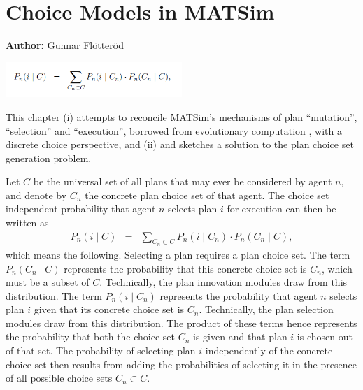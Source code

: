 \chapter{Choice Models in MATSim}
\label{ch:discretechoice}

\hfill \textbf{Author:} Gunnar Flötteröd

\begin{center} \includegraphics[width=0.5\textwidth, angle=0]{understanding/figures/dc.png} \end{center}

This chapter (i) attempts to reconcile MATSim's mechanisms of plan
{}``mutation'', {}``selection'' and {}``execution'', borrowed from evolutionary computation , with a 
discrete choice perspective, and (ii) and sketches a solution to the
plan choice set generation problem.

Let $C$ be the universal set of all plans that may ever be considered
by agent $n$, and denote by $C_{n}$ the concrete plan choice set
of that agent. The choice set independent probability that agent $n$
selects plan $i$ for execution can then be written as
\begin{eqnarray}
P_{n}(i\mid C) & = & \sum_{C_{n}\subset C}P_{n}(i\mid C_{n})\cdot P_{n}(C_{n}\mid C),\label{eq:unconditional-choice-proba}
\end{eqnarray}
which means the following. Selecting a plan requires a plan choice
set. The term $P_{n}(C_{n}\mid C)$ represents the probability that
this concrete choice set is $C_{n}$, which must be a subset of $C$.
Technically, the plan innovation modules draw from this distribution.
The term $P_{n}(i\mid C_{n})$ represents the probability that agent
$n$ selects plan $i$ given that its concrete choice set is $C_{n}$.
Technically, the plan selection modules draw from this distribution.
The product of these terms hence represents the probability that both
the choice set $C_{n}$ is given and that plan $i$ is chosen out
of that set. The probability of selecting plan $i$ independently
of the concrete choice set then results from adding the probabilities
of selecting it in the presence of all possible choice sets $C_{n}\subset C$.

